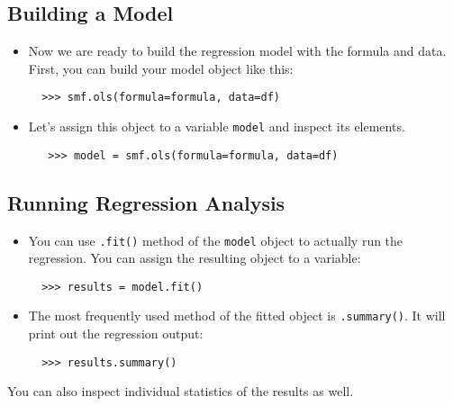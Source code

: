 \documentclass[10pt,article]{article}
\begin{document}
\subsection{Building a Model}
\label{sec:org5be6169}
\begin{itemize}
\item Now we are ready to build the regression model with the formula and
data. First, you can build your model object like this:

\begin{verbatim}
  >>> smf.ols(formula=formula, data=df)
\end{verbatim}

\item Let's assign this object to a variable \texttt{model} and inspect its elements.

\begin{verbatim}
   >>> model = smf.ols(formula=formula, data=df)
\end{verbatim}
\end{itemize}
\subsection{Running Regression Analysis}
\label{sec:org3ba6034}
\begin{itemize}
\item You can use \texttt{.fit()} method of the \texttt{model} object to actually run the
regression. You can assign the resulting object to a variable:

\begin{verbatim}
  >>> results = model.fit()
\end{verbatim}

\item The most frequently used method of the fitted object is \texttt{.summary()}. It
will print out the regression output:

\begin{verbatim}
  >>> results.summary()
\end{verbatim}
\end{itemize}

You can also inspect individual statistics of the results as well.
\end{document}
